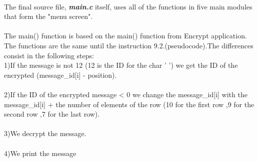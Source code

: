 \documentclass[14pt]{article}
\begin{document}
\\The final source file, \textbf{\textit{main.c}} itself, uses all of the functions in five main modules that form the "menu screen".\\
\\The main() function is based on the main() function from Encrypt application. The functions are the same until the instruction 9.2.(pseudocode).The differences consist in the following steps:
\\1)If the message is not 12 (12 is the ID for the char ' ') we get the ID of the encrypted (message\_id[i] - position).\\
\\2)If the ID of the encrypted message < 0 we change the message\_id[i] with the message\_id[i] + the number of elements of the row (10 for the first row ,9 for the second row ,7 for the last row).\\
\\3)We decrypt the message.\\
\\4)We print the message\\
\newpage
\end{document}
